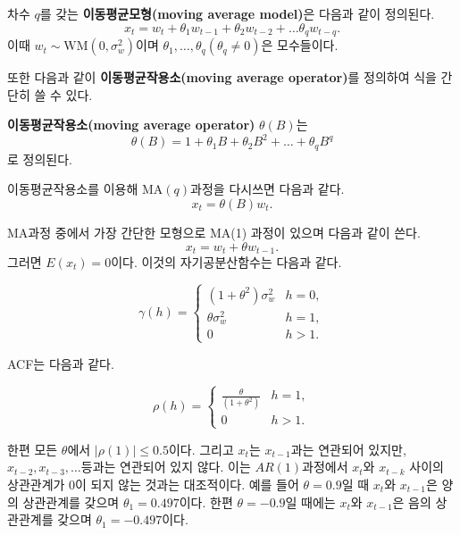 \documentclass[b5paper,]{scrbook}
\theoremstyle{plain}
\theoremstyle{definition}
\numberwithin{equation}{section}
\let\BeginKnitrBlock\begin \let\EndKnitrBlock\end
\begin{document}
\BeginKnitrBlock{definition}[이동평균모형]
\protect\hypertarget{def:unnamed-chunk-221}{}{\label{def:unnamed-chunk-221} {} }차수 \(q\)를 갖는 \textbf{이동평균모형(moving average model)}은 다음과 같이 정의된다.
\[x_{t}=w_{t}+\theta_{1}w_{t-1}+\theta_{2}w_{t-2}+\ldots \theta_{q}w_{t-q}.\]
이때 \(w_{t}\sim \text{WM}(0,\sigma_{w}^{2})\)이며 \(\theta_{1},\ldots, \theta_{q}(\theta_{q}\neq 0)\)은 모수들이다.
\EndKnitrBlock{definition}

또한 다음과 같이 \textbf{이동평균작용소(moving average operator)}를 정의하여 식을 간단히 쓸 수 있다.

\BeginKnitrBlock{definition}[이동평균작용소]
\protect\hypertarget{def:unnamed-chunk-222}{}{\label{def:unnamed-chunk-222} {} }\textbf{이동평균작용소(moving average operator)} \(\theta(B)\)는
\[\theta(B)=1+\theta_{1}B+\theta_{2}B^{2}+\ldots +\theta_{q}B^{q}\]
로 정의된다.
\EndKnitrBlock{definition}

이동평균작용소를 이용해 \(\text{MA}(q)\)과정을 다시쓰면 다음과 같다.
\[x_{t}=\theta(B)w_{t}.\]

\BeginKnitrBlock{example}[MA(1)과정]
\protect\hypertarget{exm:unnamed-chunk-223}{}{\label{exm:unnamed-chunk-223} {} }MA과정 중에서 가장 간단한 모형으로 MA(1) 과정이 있으며 다음과 같이 쓴다.
\[x_{t}=w_{t}+\theta w_{t-1}.\]
그러면 \(E(x_{t})=0\)이다. 이것의 자기공분산함수는 다음과 같다.

\[
\gamma(h) = 
\begin{cases}
(1+\theta^{2})\sigma_{w}^{2} & h=0,\\
\theta \sigma_{w}^{2} & h=1,\\
0 & h>1.
\end{cases}
\]

ACF는 다음과 같다.

\[
\rho(h) = 
\begin{cases}
\frac{\theta}{(1+\theta^{2})} & h=1,\\
0 & h>1.
\end{cases}
\]

한편 모든 \(\theta\)에서 \(|\rho(1)|\leq 0.5\)이다. 그리고 \(x_{t}\)는 \(x_{t-1}\)과는 연관되어 있지만, \(x_{t-2}, x_{t-3},\ldots\)등과는 연관되어 있지 않다. 이는 \(AR(1)\)과정에서 \(x_{t}\)와 \(x_{t-k}\) 사이의 상관관계가 0이 되지 않는 것과는 대조적이다. 예를 들어 \(\theta=0.9\)일 때 \(x_{t}\)와 \(x_{t-1}\)은 양의 상관관계를 갖으며 \(\theta_{1}=0.497\)이다. 한편 \(\theta=-0.9\)일 때에는 \(x_{t}\)와 \(x_{t-1}\)은 음의 상관관계를 갖으며 \(\theta_{1}=-0.497\)이다.
\EndKnitrBlock{example}
\end{document}
